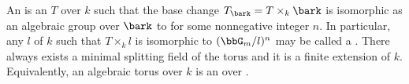 \begin{definition} \label{definition:algebraic_torus_over_a_field}
    An  is an  $T$ over $k$ such that the base change $T_{\bark} = T \times_{k} \bark$ is isomorphic as an algebraic group over $\bark$ to  for some nonnegative integer $n$. In particular, any $l$ of $k$ such that $T \times_{k} l$ is isomorphic to $(\bbG_{m}/l)^n$ may be called a . There always exists a minimal splitting field of the  torus and it is a finite extension of $k$.
    Equivalently, an algebraic torus over $k$ is an  over .

\end{definition}

